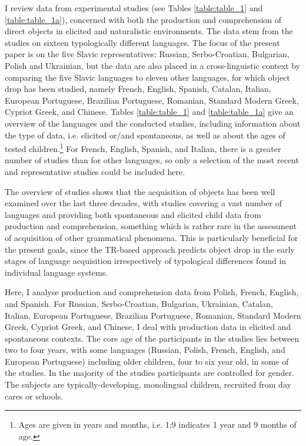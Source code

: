 \documentclass[output=paper,
modfonts,
newtxmath,
hidelinks,
]{langscibook}
\begin{document}
I review data from experimental studies (see Tables \ref{table:table_1} and \ref{table:table_1a}), concerned with both the production and comprehension of direct objects in elicited and naturalistic environments. The data stem from the studies on sixteen typologically different languages. The focus of the present paper is on the five Slavic representatives: Russian, Serbo-Croatian, Bulgarian, Polish and Ukrainian, but the data are also placed in a cross-linguistic context by comparing the five Slavic languages to eleven other languages, for which object drop has been studied, namely French, English, Spanish, Catalan, Italian, European Portuguese, Brazilian Portuguese, Romanian, Standard Modern Greek, Cypriot Greek, and Chinese. Tables \ref{table:table_1} and \ref{table:table_1a} give an overview of the languages and the conducted studies, including information about the type of data, i.e. elicited or/and spontaneous, as well as about the ages of tested children.\footnote{\label{fn3}Ages are given in years and months, i.e. 1;9 indicates 1 year and 9 months of age.} For French, English, Spanish, and Italian, there is a greater number of studies than for other languages, so only a selection of the most recent and representative studies could be included here.

The overview of studies shows that the acquisition of objects has been well examined over the last three decades, with studies covering a vast number of languages and providing both spontaneous and elicited child data from production and comprehension, something which is rather rare in the assessment of acquisition of other grammatical phenomena. This is particularly beneficial for the present goals, since the TR-based approach predicts object drop in the early stages of language acquisition irrespectively of typological differences found in individual language systems.\largerpage[-2]

Here, I analyse production and comprehension data from Polish, French, English, and Spanish. For Russian, Serbo-Croatian, Bulgarian, Ukrainian, Catalan, Italian, European Portuguese, Brazilian Portuguese, Romanian, Standard Modern Greek, Cypriot Greek, and Chinese, I deal with production data in elicited and spontaneous contexts. The core age of the participants in the studies lies between two to four years, with some languages (Russian, Polish, French, English, and European Portuguese) including older children, four to six year old, in some of the studies. In the majority of the studies participants are controlled for gender. The subjects are typically-developing, monolingual children, recruited from day cares or schools.
\end{document}
